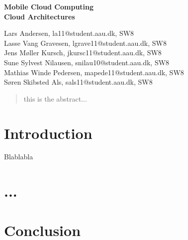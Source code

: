 \documentclass[12pt,a4paper]{article}
\begin{document}
\begin{center}
\bigskip\bigskip
{\Large\bf Mobile Cloud Computing\\}
\bigskip
{\Large\bf Cloud Architectures}
\bigskip\bigskip


Lars Andersen, la11@student.aau.dk, SW8\\
Lasse Vang Gravesen, lgrave11@student.aau.dk, SW8\\
Jens Møller Kursch, jkursc11@student.aau.dk, SW8\\
Sune Sylvest Nilausen, snilau10@student.aau.dk, SW8\\
Mathias Winde Pedersen, mapede11@student.aau.dk, SW8\\
Søren Skibsted Als, sals11@student.aau.dk, SW8 %

\bigskip
\begin{abstract}
this is the abstract...
\end{abstract}

\thispagestyle{empty}
\end{center}


\titlepage

\thispagestyle{plain}


\section{Introduction}
Blablabla \citep{misc:mobilecloudcomputing}

\section{...}



\section{Conclusion}




\label{bib:mybiblio}
\end{document}
